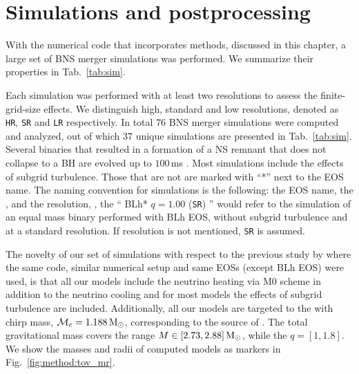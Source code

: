\section{Simulations and postprocessing}


With the numerical code \wisky{} that incorporates methods, 
discussed in this chapter, a large set of \ac{BNS} merger 
simulations was performed. We summarize their properties in 
Tab.~\ref{tab:sim}. 
%



Each simulation was performed with at least two resolutions to assess the 
finite-grid-size effects. We distinguish high, standard and low resolutions, 
denoted as \texttt{HR}, \texttt{SR} and \texttt{LR} respectively. 
%
In total $76$ \ac{BNS} merger simulations were computed and analyzed, 
out of which $37$ unique simulations are presented in Tab.~\ref{tab:sim}. 
%
%
%
Several binaries that resulted in a formation of a \ac{NS} remnant 
that does not collapse to a \ac{BH} are evolved up to $100\,$ms \pmerg.
%
Most simulations include the effects of subgrid turbulence. 
Those that are not are marked with ``*'' next to the \ac{EOS} name.
%
The naming convention for simulations is the following: 
the \ac{EOS} name, the \mr{}, and the resolution, \eg, 
the `` BLh* $q=1.00$ (\texttt{SR}) '' would refer to the simulation of an 
equal mass binary performed with BLh \ac{EOS}, without subgrid 
turbulence and at a standard resolution. 
If resolution is not mentioned, \texttt{SR} is assumed.

%
The novelty of our set of simulations with 
respect to the previous study by \citet{Radice:2018pdn} where the same code,
similar numerical setup and same \acp{EOS} (except BLh \ac{EOS}) were used, 
is that all our models include the neutrino heating via 
M0 scheme in addition to the neutrino cooling 
and for most models the effects of subgrid turbulence  
are included.  %
Additionally, all our models are targeted to the \GW{} 
with chirp mass, $\mathcal{M}_c = 1.188\,{\text{M}_{\odot}}$,  
corresponding to the source of \GW{}. The total gravitational mass covers 
the range $M\in[2.73, 2.88]\,{\text{M}_{\odot}}$, while the \mr{} $q=[1,1.8]$. 
%
We show the masses and radii of computed models as markers in 
Fig.~\ref{fig:method:tov_mr}.

